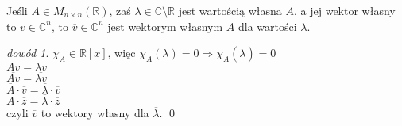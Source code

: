 \documentclass[10pt]{article}
\theoremstyle{definition}
\theoremstyle{definition}
\theoremstyle{definition}
\theoremstyle{definition}
\theoremstyle{remark}
\newtheorem*{dd}{dowód}
\theoremstyle{definition}
\theoremstyle{definition}
\theoremstyle{definition}
\theoremstyle{definition}
\theoremstyle{definition}
\begin{document}
\begin{ft} 
    Jeśli $A \in M_{n\times n}(\mathbb{R})$, zaś $\lambda \in \mathbb{C} \setminus \mathbb{R}$ jest 
    wartością własna $A$, a jej wektor własny to $v \in \mathbb{C}^n$, to $\overline{v} \in \mathbb{C}^n$ jest
    wektorym własnym $A$ dla wartości $\overline{\lambda}$.
\end{ft} 
\begin{dd} 
    $\chi_A \in \mathbb{R}[x]$, więc $\chi_A (\lambda ) = 0 \Rightarrow \chi_A(\overline{\lambda}) = 0$ \\ 
    $Av = \lambda v$ \\ 
    $\overline{Av} = \overline{\lambda v}$ \\ 
    $\overline{A} \cdot \overline{v} = \overline{\lambda} \cdot \overline{v} $ \\ 
    $ A \cdot \overline{z} = \overline{\lambda} \cdot \overline{z}$ \\ 
    czyli $\overline{v}$ to wektory własny dla $\overline{\lambda}$. \hfill \qed
\end{dd} 
\end{document}
